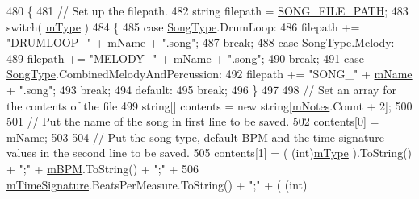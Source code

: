 \begin{DoxyCode}
480     \{
481         \textcolor{comment}{// Set up the filepath.}
482         \textcolor{keywordtype}{string} filepath = \hyperlink{group___song_const_ga95247572cf734f9e8b35973de4eeb1a4}{SONG\_FILE\_PATH};
483         \textcolor{keywordflow}{switch}( \hyperlink{group___song_priv_var_gaf3b9d0f461522324f897b746311b43c5}{mType} )
484         \{
485             \textcolor{keywordflow}{case} \hyperlink{group___song_enums_gae681a1f001333e39fc1cb4fea97bfe1b}{SongType}.DrumLoop:
486                 filepath += \textcolor{stringliteral}{"DRUMLOOP\_"} + \hyperlink{group___song_priv_var_ga6a5e6c1e4aa92939e2b5c1e3d9908df8}{mName} + \textcolor{stringliteral}{".song"};
487                 \textcolor{keywordflow}{break};
488             \textcolor{keywordflow}{case} \hyperlink{group___song_enums_gae681a1f001333e39fc1cb4fea97bfe1b}{SongType}.Melody:
489                 filepath += \textcolor{stringliteral}{"MELODY\_"} + \hyperlink{group___song_priv_var_ga6a5e6c1e4aa92939e2b5c1e3d9908df8}{mName} + \textcolor{stringliteral}{".song"};
490                 \textcolor{keywordflow}{break};
491             \textcolor{keywordflow}{case} \hyperlink{group___song_enums_gae681a1f001333e39fc1cb4fea97bfe1b}{SongType}.CombinedMelodyAndPercussion:
492                 filepath += \textcolor{stringliteral}{"SONG\_"} + \hyperlink{group___song_priv_var_ga6a5e6c1e4aa92939e2b5c1e3d9908df8}{mName} + \textcolor{stringliteral}{".song"};
493                 \textcolor{keywordflow}{break};
494             \textcolor{keywordflow}{default}:
495                 \textcolor{keywordflow}{break};
496         \}
497 
498         \textcolor{comment}{// Set an array for the contents of the file}
499         \textcolor{keywordtype}{string}[] contents = \textcolor{keyword}{new} \textcolor{keywordtype}{string}[\hyperlink{group___song_priv_var_ga674bc904a1f856d485d5fb7fe84bac85}{mNotes}.Count + 2];
500 
501         \textcolor{comment}{// Put the name of the song in first line to be saved.}
502         contents[0] = \hyperlink{group___song_priv_var_ga6a5e6c1e4aa92939e2b5c1e3d9908df8}{mName};
503 
504         \textcolor{comment}{// Put the song type, default BPM and the time signature values in the second line to be saved.}
505         contents[1] = ( (int)\hyperlink{group___song_priv_var_gaf3b9d0f461522324f897b746311b43c5}{mType} ).ToString() + \textcolor{stringliteral}{";"} + \hyperlink{group___song_priv_var_ga3341fbbd9c0c58fe6514623e6b6c5a1e}{mBPM}.ToString() + \textcolor{stringliteral}{";"} +
506             \hyperlink{group___song_priv_var_ga2b2dcc0e83e49f7303b6a1371877b25e}{mTimeSignature}.BeatsPerMeasure.ToString() + \textcolor{stringliteral}{";"} + ( (int)

\end{DoxyCode}
